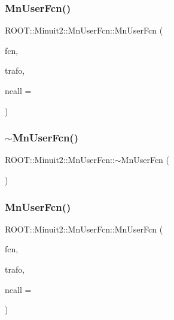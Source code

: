 \subsubsection{\texorpdfstring{MnUserFcn()}{MnUserFcn()}\hspace{0.1cm}{\footnotesize\ttfamily [1/2]}}
{\footnotesize\ttfamily R\+O\+O\+T\+::\+Minuit2\+::\+Mn\+User\+Fcn\+::\+Mn\+User\+Fcn (\begin{DoxyParamCaption}\item[{const \mbox{\hyperlink{classROOT_1_1Minuit2_1_1FCNBase}{F\+C\+N\+Base}} \&}]{fcn,  }\item[{const \mbox{\hyperlink{classROOT_1_1Minuit2_1_1MnUserTransformation}{Mn\+User\+Transformation}} \&}]{trafo,  }\item[{int}]{ncall = {} }\end{DoxyParamCaption})\hspace{0.3cm}{\ttfamily [inline]}}

\mbox{\label{classROOT_1_1Minuit2_1_1MnUserFcn_afa175648109f4cec5ab7dd274d0b0e75}} 
\subsubsection{\texorpdfstring{$\sim$MnUserFcn()}{~MnUserFcn()}\hspace{0.1cm}{\footnotesize\ttfamily [1/2]}}
{\footnotesize\ttfamily R\+O\+O\+T\+::\+Minuit2\+::\+Mn\+User\+Fcn\+::$\sim$\+Mn\+User\+Fcn (\begin{DoxyParamCaption}{ }\end{DoxyParamCaption})\hspace{0.3cm}{\ttfamily [inline]}}

\mbox{\label{classROOT_1_1Minuit2_1_1MnUserFcn_aec0ec51bd2b1e3b88f686f802f2c277f}} 
\subsubsection{\texorpdfstring{MnUserFcn()}{MnUserFcn()}\hspace{0.1cm}{\footnotesize\ttfamily [2/2]}}
{\footnotesize\ttfamily R\+O\+O\+T\+::\+Minuit2\+::\+Mn\+User\+Fcn\+::\+Mn\+User\+Fcn (\begin{DoxyParamCaption}\item[{const \mbox{\hyperlink{classROOT_1_1Minuit2_1_1FCNBase}{F\+C\+N\+Base}} \&}]{fcn,  }\item[{const \mbox{\hyperlink{classROOT_1_1Minuit2_1_1MnUserTransformation}{Mn\+User\+Transformation}} \&}]{trafo,  }\item[{int}]{ncall = {} }\end{DoxyParamCaption})\hspace{0.3cm}{\ttfamily [inline]}}

